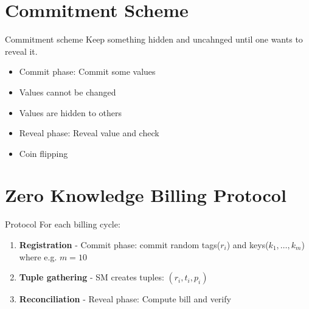 \documentclass[10pt]{beamer}
\begin{document}
\section{Commitment Scheme}
\begin{frame}{Commitment scheme}
  Keep something hidden and uncahnged until one wants to reveal it.
  \begin{itemize}
  \item Commit phase: Commit some values
  \item Values cannot be changed
  \item Values are hidden to others
  \item Reveal phase: Reveal value and check
  \item Coin flipping
  \end{itemize}
\end{frame}

\section{Zero Knowledge Billing Protocol}
\begin{frame}{Protocol}
  For each billing cycle:
  \begin{enumerate}
  \item \textbf{Registration} - Commit phase: commit random tags($r_i$) and keys($k_1, \dots, k_m$) where e.g. $m = 10$
  \item \textbf{Tuple gathering} - SM creates tuples: $(r_i, t_i, p_i)$
  \item \textbf{Reconciliation} - Reveal phase: Compute bill and verify
  \end{enumerate}
\end{frame}

{\aauwavesbg
\begin{frame}
\end{frame}}
\end{document}
